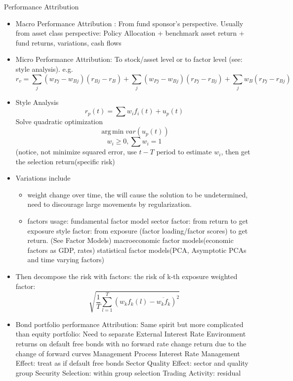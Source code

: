 \documentclass[11pt, openany]{book}              %
\DeclareMathOperator*{\argmin}{arg\,min}  %
\begin{document}
Performance Attribution

\begin{itemize}	

 \item Macro Performance Attribution : From fund sponsor's perspective. 
 	\subitem Usually from asset class perspective: Policy Allocation + benchmark asset return + fund returns, variations, cash flows
 \item Micro Performance Attribution: To stock/asset level or to factor level (see: style analysis).
 e.g.
 $$r_v = \sum_j(w_{Pj} - w_{Bj})(r_{Bj}- r_B) + \sum _j(w_{Pj} - w_{Bj})(r_{Pj} - r_{Bj}) + \sum_j w_B (r_{Pj} - r_{Bj}) $$
 \item Style Analysis
 	$$r_p(t) = \sum w_i f_i(t) + u_p(t)$$
 	Solve quadratic optimization
 	$$\argmin var(u_p(t))$$
 	$$w_i \geq 0, \sum w_i = 1$$
 	(notice, not minimize squared error, use $t-T$ period to estimate $w_i$, then get the selection return(specific risk) \\
  \item Variations include
  
    \begin{itemize}
  	\item weight change over time, the will cause the solution to be undetermined, need to discourage large movements by regularization. 
  	\item factors usage: 
  	\subitem  fundamental factor model 
  		\subsubitem sector factor: from return to get exposure
  		\subsubitem style factor: from exposure (factor loading/factor scores) to get return. (See Factor Models)
  	\subitem macroeconomic factor models(economic factors as GDP, rates)
  	\subitem statistical factor models(PCA, Asymptotic PCAs and time varying factors) 
  \end{itemize} 
  
  \item Then decompose the risk with factors: the risk of k-th exposure weighted factor: $$\sqrt{\frac{1}{T}\sum_{l=1}^T (w_k f_k(l) - \overline{w_k f_k})^2}$$
  \item Bond portfolio performance Attribution: Same spirit but more complicated than equity portfolio: Need to separate 
  	\subitem External Interest Rate Environment
  	  	\subsubitem returns on default free bonds with no forward rate change
  		\subsubitem return due to the change of forward curves
  	\subitem Management Process
  		\subsubitem Interest Rate Management Effect: treat as if default free bonds
  		\subsubitem Sector Quality Effect: sector and quality group
  		\subsubitem Security Selection: within group selection
  		\subsubitem Trading Activity: residual
\end{itemize}
\end{document}
